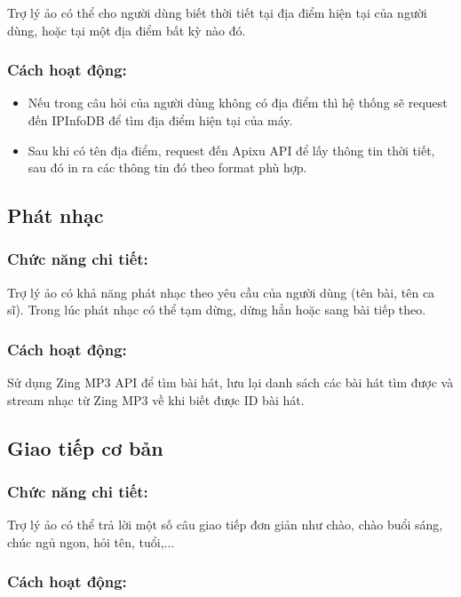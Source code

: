 Trợ lý ảo có thể cho người dùng biết thời tiết tại địa điểm hiện tại của người dùng, hoặc tại một địa điểm bất kỳ nào đó.

\subsubsection{Cách hoạt động:}

\begin{itemize}
    \item Nếu trong câu hỏi của người dùng không có địa điểm thì hệ thống sẽ request đến IPInfoDB để tìm địa điểm hiện tại của máy.
    \item Sau khi có tên địa điểm, request đến Apixu API để lấy thông tin thời tiết, sau đó in ra các thông tin đó theo format phù hợp.
\end{itemize}

\subsection{Phát nhạc}

\subsubsection{Chức năng chi tiết:}

Trợ lý ảo có khả năng phát nhạc theo yêu cầu của người dùng (tên bài, tên ca sĩ). Trong lúc phát nhạc có thể tạm dừng, dừng hẳn hoặc sang bài tiếp theo.

\subsubsection{Cách hoạt động:}

Sử dụng Zing MP3 API để tìm bài hát, lưu lại danh sách các bài hát tìm được và stream nhạc từ Zing MP3 về khi biết được ID bài hát.

\subsection{Giao tiếp cơ bản}

\subsubsection{Chức năng chi tiết:}

Trợ lý ảo có thể trả lời một số câu giao tiếp đơn giản như chào, chào buổi sáng, chúc ngủ ngon, hỏi tên, tuổi,...

\subsubsection{Cách hoạt động:}

